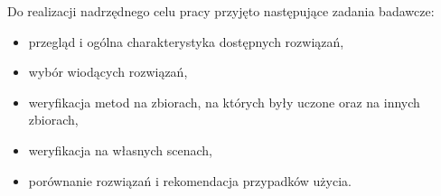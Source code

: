 Do realizacji nadrzędnego celu pracy przyjęto następujące zadania badawcze:
\begin{itemize}
    \item przegląd i ogólna charakterystyka dostępnych rozwiązań,
    \item wybór wiodących rozwiązań,
    \item weryfikacja metod na zbiorach, na których były uczone oraz na innych zbiorach,
    \item weryfikacja na własnych scenach,
    \item porównanie rozwiązań i rekomendacja przypadków użycia.
\end{itemize}

